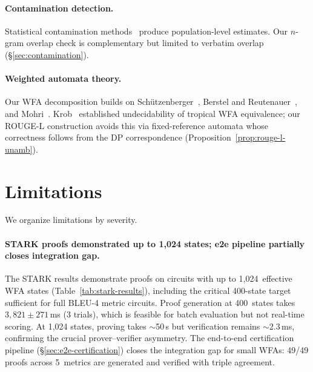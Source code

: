 \documentclass[11pt]{article}
\begin{document}
\paragraph{Contamination detection.}
Statistical contamination methods~\cite{sainz2023contamination,shi2024contamination}
produce population-level estimates.  Our $n$-gram overlap check is
complementary but limited to verbatim overlap (\S\ref{sec:contamination}).

\paragraph{Weighted automata theory.}
Our WFA decomposition builds on Sch\"utzenberger~\cite{schutzenberger1961},
Berstel and Reutenauer~\cite{berstel2011noncommutative}, and
Mohri~\cite{mohri2009weighted,droste2009handbook}.
Krob~\cite{krob1994equality} established undecidability of tropical WFA
equivalence; our ROUGE-L construction avoids this via
fixed-reference automata whose correctness follows from
the DP correspondence (Proposition~\ref{prop:rouge-l-unamb}).


\section{Limitations}\label{sec:limitations}

We organize limitations by severity.

\paragraph{STARK proofs demonstrated up to 1{,}024 states; e2e pipeline partially closes integration gap.}
The STARK results demonstrate proofs on circuits with up to
1{,}024~effective WFA states (Table~\ref{tab:stark-results}), including
the critical 400-state target sufficient for full BLEU-4 metric circuits.
Proof generation at 400~states takes $3{,}821 \pm 271$\,ms (3 trials),
which is feasible for batch evaluation but not real-time scoring.
At 1{,}024 states, proving takes ${\sim}$50\,s but verification
remains ${\sim}$2.3\,ms, confirming the crucial prover--verifier asymmetry.
The end-to-end certification pipeline (\S\ref{sec:e2e-certification})
closes the integration gap for small WFAs: 49/49 proofs across 5~metrics
are generated and verified with triple agreement.
\end{document}
